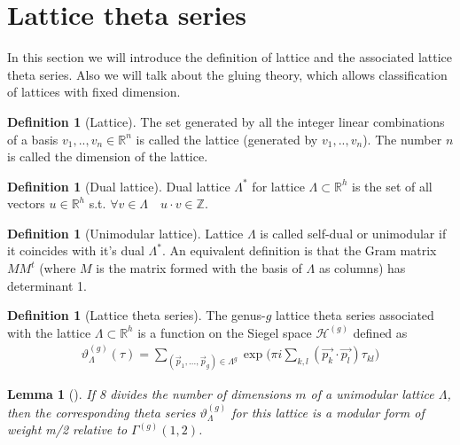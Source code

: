 \documentclass{article}
\newcommand{\ZZ}{\mathbb{Z}}
\newcommand{\RR}{\mathbb{R}}
\theoremstyle{plain}
\newtheorem{lemma}[theorem]{Lemma}
\theoremstyle{definition}
\newtheorem{definition}[theorem]{Definition}
\begin{document}
\section{Lattice theta series}\label{sec:lattice-theta-series}
In this section we will introduce the definition of lattice and the associated lattice theta series.
Also we will talk about the gluing theory, which allows classification
of lattices with fixed dimension.
\begin{definition}[Lattice]
    The set generated by all the integer linear combinations of a basis 
    $v_1, .., v_n \in \RR^n$ is called the lattice (generated by $v_1, .., v_n$).
    The number $n$ is called the dimension of the lattice.
\end{definition}

\begin{definition}[Dual lattice]
    Dual lattice $\Lambda^*$ for lattice $\Lambda \subset \RR^h$ 
    is the set of all vectors $u \in \RR^h$ s.t. 
    $\forall v \in \Lambda \quad u \cdot v \in \ZZ$.
\end{definition}

\begin{definition}[Unimodular lattice]
    Lattice $\Lambda$ is called self-dual or unimodular if it coincides with it's dual $\Lambda^*$. 
    An equivalent definition is that the Gram matrix $MM^t$ (where $M$ is the matrix formed with 
    the basis of $\Lambda$ as columns) has determinant 1.
\end{definition}


\begin{definition}[Lattice theta series]
    The genus-$g$ lattice theta series associated with the lattice $\Lambda \subset \RR^h$ is 
    a function on the Siegel space $\mathcal{H}^{(g)}$ defined as
    \begin{align}
        \vartheta^{(g)}_{\Lambda}(\tau) = 
        \sum_{(\vec p_1, ..., \vec p_g) \in \Lambda^g}
            \exp \Big(
                \pi i \sum_{k, l}({\vec{p_k}} \cdot {\vec{p_l}}) \tau_{kl}
            \Big)
    \end{align}
\end{definition}

\begin{lemma}[\cite{opsmy}]
    If 8 divides the number of dimensions $m$ of a unimodular lattice
    $\Lambda$, then the corresponding theta series $\vartheta^{(g)}_{\Lambda}$ for this lattice is a modular form of weight m/2 relative to $\Gamma^{(g)}(1,2)$.
\end{lemma}
\end{document}
